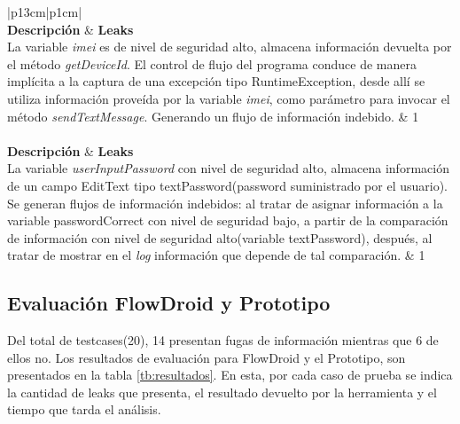 \begin{table}[H]
\begin{tabular}{|p{13cm}|p{1cm}|}
	\hline
	\\
	\hline
	\textbf{Descripción} & \textbf{Leaks}\\
	\hline
	La variable \textit{imei} es de nivel de seguridad alto, almacena información
	devuelta por el método \textit{getDeviceId}. El control de flujo del
	programa conduce de manera implícita a la captura de una excepción tipo
	RuntimeException, desde allí se utiliza información proveída por la variable
	\textit{imei}, como parámetro para invocar el método \textit{sendTextMessage}.
	Generando un flujo de información indebido. & 1
	\\
	\hline
	\\
	\hline
	\textbf{Descripción} & \textbf{Leaks}\\
	\hline
	 La variable \textit{userInputPassword} con nivel de seguridad alto, almacena
	 información de un campo EditText tipo textPassword(password suministrado por
	 el usuario). Se generan flujos de información indebidos: al tratar de asignar
	 información a la variable passwordCorrect con nivel de seguridad bajo, a
	 partir de la comparación de información con nivel de seguridad alto(variable
	 textPassword), después, al tratar de mostrar en el \textit{log} información
	 que depende de tal comparación. & 1\\
	\hline
\end{tabular}
\caption{Descripción aplicaciones de prueba.\newline
Se considera con nivel de seguridad alto, variables y métodos que almacenan y
modifican(respectivamente), información catalogada como privada(Sources).\newline 
Se considera con nivel de seguridad bajo, canales para envío de mensajes,
muestra de logs y canales creados durante el control de flujo del programa.\newline }
\label{tab:descripApps0}
\end{table}

\subsection{Evaluación FlowDroid y Prototipo } 
\label{subsec:fvsp}
Del total de testcases(20), 14 presentan fugas de información mientras que 6 de
ellos no. Los resultados de evaluación para FlowDroid y el Prototipo, son
presentados en la tabla \ref{tb:resultados}. En esta, por cada caso de prueba
se indica la cantidad de leaks que presenta, el resultado devuelto por la
herramienta y el tiempo que tarda el análisis.

